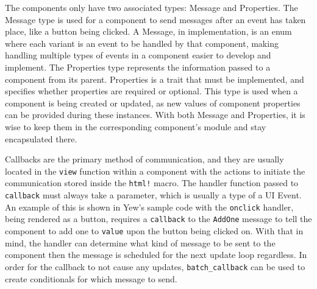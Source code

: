 \documentclass[
    paper=letter,
    parskip=half,
    fontsize=12pt,
    titlepage=firstiscover,
    toc=bibliography,
    numbers=endperiod
]{scrartcl}
\begin{document}
The components only have two associated types: Message and Properties.
The Message type is used for a component to send messages after an event
has taken place, like a button being clicked. A Message, in
implementation, is an enum where each variant is an event to be handled
by that component, making handling multiple types of events in a
component easier to develop and implement. The Properties type
represents the information passed to a component from its parent.
Properties is a trait that must be implemented, and specifies whether
properties are required or optional. This type is used when a component
is being created or updated, as new values of component properties can
be provided during these instances. With both Message and Properties, it
is wise to keep them in the corresponding component's module and stay
encapsulated there.

Callbacks are the primary method of communication, and they are usually
located in the \texttt{view} function within a component with the
actions to initiate the communication stored inside the \texttt{html!}
macro. The handler function passed to \texttt{callback} must always take
a parameter, which is usually a type of a UI Event. An example of this
is shown in Yew's sample code with the \texttt{onclick} handler, being
rendered as a button, requires a \texttt{callback} to the
\texttt{AddOne} message to tell the component to add one to
\texttt{value} upon the button being clicked on. With that in mind, the
handler can determine what kind of message to be sent to the component
then the message is scheduled for the next update loop regardless. In
order for the callback to not cause any updates,
\texttt{batch\_callback} can be used to create conditionals for which
message to send.
\end{document}
